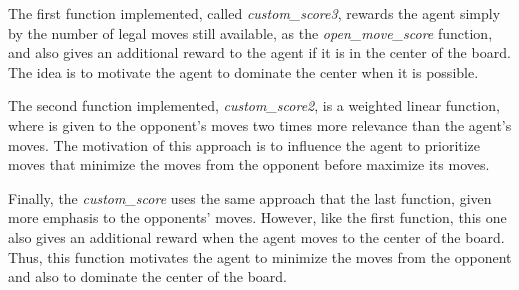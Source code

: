 \documentclass[a4paper]{article}
\begin{document}

The first function implemented, called \textit{custom\_score3}, rewards the agent simply by the number of legal moves still available, as the \textit{open\_move\_score} function, and also gives an additional reward to the agent if it is in the center of the board. The idea is to motivate the agent to dominate the center when it is possible.

The second function implemented, \textit{custom\_score2}, is a weighted linear function, where is given to the opponent's moves two times more relevance than the agent's moves. The motivation of this approach is to influence the agent to prioritize moves that minimize the moves from the opponent before maximize its moves.

Finally, the \textit{custom\_score} uses the same approach that the last function, given more emphasis to the opponents' moves. However, like the first function, this one also gives an additional reward when the agent moves to the center of the board. Thus, this function motivates the agent to minimize the moves from the opponent and also to dominate the center of the board.

































\end{document}
